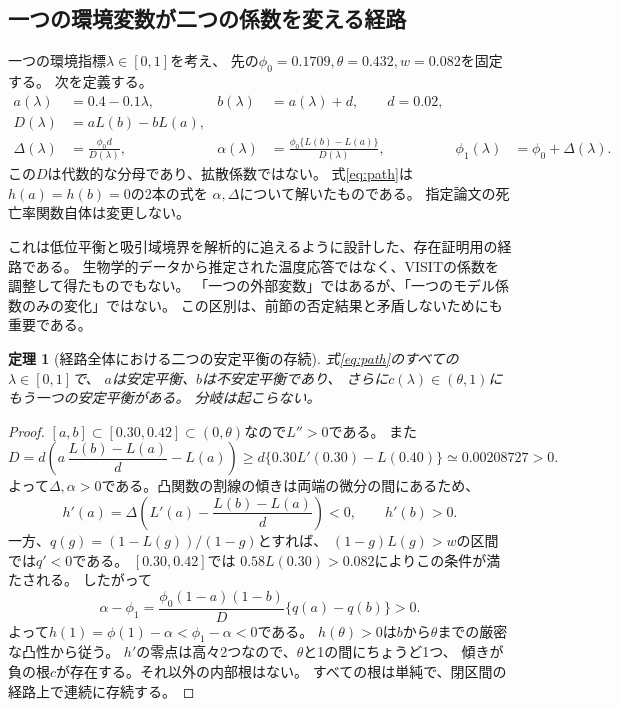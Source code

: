 \documentclass[a4paper,11pt]{ltjsarticle}
\newtheorem{theorem}[proposition]{定理}
\begin{document}
\subsection{一つの環境変数が二つの係数を変える経路}
一つの環境指標$\lambda\in[0,1]$を考え、
先の$\phi_0=0.1709,\theta=0.432,w=0.082$を固定する。
次を定義する。
\begin{align}
 a(\lambda)&=0.4-0.1\lambda,& b(\lambda)&=a(\lambda)+d,\qquad d=0.02,\\
 D(\lambda)&=aL(b)-bL(a),\\
 \Delta(\lambda)&=\frac{\phi_0 d}{D(\lambda)},&
 \alpha(\lambda)&=\frac{\phi_0\{L(b)-L(a)\}}{D(\lambda)},&
 \phi_1(\lambda)&=\phi_0+\Delta(\lambda). \label{eq:path}
\end{align}
この$D$は代数的な分母であり、拡散係数ではない。
式\eqref{eq:path}は$h(a)=h(b)=0$の2本の式を
$\alpha,\Delta$について解いたものである。
指定論文の死亡率関数自体は変更しない。

これは低位平衡と吸引域境界を解析的に追えるように設計した、存在証明用の経路である。
生物学的データから推定された温度応答ではなく、VISITの係数を調整して得たものでもない。
「一つの外部変数」ではあるが、「一つのモデル係数のみの変化」ではない。
この区別は、前節の否定結果と矛盾しないためにも重要である。

\begin{theorem}[経路全体における二つの安定平衡の存続]
式\eqref{eq:path}のすべての$\lambda\in[0,1]$で、
$a$は安定平衡、$b$は不安定平衡であり、
さらに$c(\lambda)\in(\theta,1)$にもう一つの安定平衡がある。
分岐は起こらない。
\end{theorem}
\begin{proof}
$[a,b]\subset[0.30,0.42]\subset(0,\theta)$なので$L''>0$である。
また
\[
 D=d\left(a\,\frac{L(b)-L(a)}d-L(a)\right)
 \ge d\{0.30 L'(0.30)-L(0.40)\}
 \simeq0.00208727>0.
\]
よって$\Delta,\alpha>0$である。凸関数の割線の傾きは両端の微分の間にあるため、
\[
 h'(a)=\Delta\left(L'(a)-\frac{L(b)-L(a)}d\right)<0,\qquad h'(b)>0.
\]
一方、$q(g)=(1-L(g))/(1-g)$とすれば、
$(1-g)L(g)>w$の区間では$q'<0$である。
$[0.30,0.42]$では
$0.58L(0.30)>0.082$によりこの条件が満たされる。
したがって
\[
 \alpha-\phi_1
 =\frac{\phi_0(1-a)(1-b)}D\{q(a)-q(b)\}>0.
\]
よって$h(1)=\phi(1)-\alpha<\phi_1-\alpha<0$である。
$h(\theta)>0$は$b$から$\theta$までの厳密な凸性から従う。
$h'$の零点は高々2つなので、$\theta$と1の間にちょうど1つ、
傾きが負の根$c$が存在する。それ以外の内部根はない。
すべての根は単純で、閉区間の経路上で連続に存続する。
\end{proof}
\end{document}
